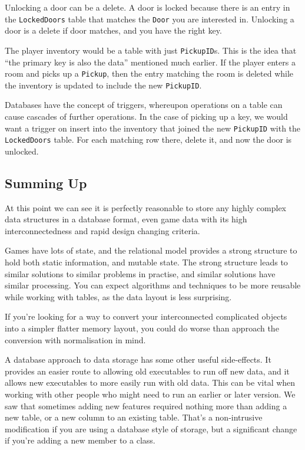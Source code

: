 \documentclass[a4paper,12pt]{book}
\begin{document}
Unlocking a door can be a delete.
A door is locked because there is an entry in the \texttt{LockedDoors} table that matches the \texttt{Door} you are interested in.
Unlocking a door is a delete if door matches, and you have the right key.

The player inventory would be a table with just \texttt{PickupID}s.
This is the idea that ``the primary key is also the data'' mentioned much earlier.
If the player enters a room and picks up a \texttt{Pickup}, then the entry matching the room is deleted while the inventory is updated to include the new \texttt{PickupID}.

Databases have the concept of triggers, whereupon operations on a table can cause cascades of further operations.
In the case of picking up a key, we would want a trigger on insert into the inventory that joined the new \texttt{PickupID} with the \texttt{LockedDoors} table.
For each matching row there, delete it, and now the door is unlocked.

\subsection{Summing Up}

At this point we can see it is perfectly reasonable to store any highly complex data structures in a database format, even game data with its high interconnectedness and rapid design changing criteria.

Games have lots of state, and the relational model provides a strong structure to hold both static information, and mutable state. The strong structure leads to similar solutions to similar problems in practise, and similar solutions have similar processing. You can expect algorithms and techniques to be more reusable while working with tables, as the data layout is less surprising.

If you're looking for a way to convert your interconnected complicated objects into a simpler flatter memory layout, you could do worse than approach the conversion with normalisation in mind.

A database approach to data storage has some other useful side-effects. It provides an easier route to allowing old executables to run off new data, and it allows new executables to more easily run with old data. This can be vital when working with other people who might need to run an earlier or later version. We saw that sometimes adding new features required nothing more than adding a new table, or a new column to an existing table. That's a non-intrusive modification if you are using a database style of storage, but a significant change if you're adding a new member to a class.
\end{document}
